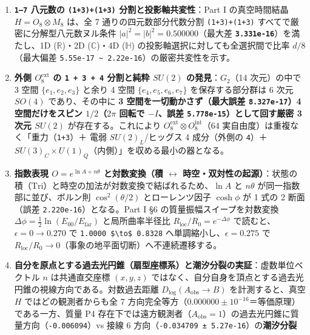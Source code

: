 \documentclass[
  a4paper,
]{ltjsarticle}
\providecommand{\tightlist}{%
  \setlength{\itemsep}{0pt}\setlength{\parskip}{0pt}}
\begin{document}
\begin{enumerate}
\def\labelenumi{\arabic{enumi}.}
\tightlist
\item
  \textbf{\texttt{1–7} 八元数の \texttt{(1+3)+(1+3)}
  分割と投影軸共変性}：Part I の真空時間結晶 \(H = O_8 \otimes M_8\)
  は、全 7 通りの四元数部分代数分割 \texttt{(1+3)+(1+3)}
  すべてで厳密に分解型八元数ヌル条件
  \(|a|^2 = |b|^2 = 0.500000\)（最大差
  \textbf{\texttt{3.331e-16}}）を満たし、1D (\(\mathbb{R}\))・2D
  (\(\mathbb{C}\))・4D (\(\mathbb{H}\))
  の投影軸選択に対しても全選択間で比率 \(d/8\)（最大偏差
  \texttt{5.55e-17\ \textasciitilde{}\ 2.22e-16}）の厳密共変性を示す。
\item
  \textbf{外側 \(O_8^{\mathrm{ext}}\) の \texttt{1\ +\ 3\ +\ 4}
  分割と純粋 \(SU(2)\) の発見}：\(G_2\)（14 次元）の中で 3 空間
  \(\{e_1,e_2,e_3\}\) と余り 4 空間 \(\{e_4,e_5,e_6,e_7\}\)
  を保存する部分群は 6 次元 \(SO(4)\) であり、その中に \textbf{3
  空間を一切動かさず（最大誤差 \texttt{8.327e-17}）4 空間だけをスピン
  \(1/2\)（\(2\pi\) 回転で \(-I\)、誤差
  \texttt{5.778e-15}）として回す厳密 3 次元 \(SU(2)\)}
  が存在する。これにより
  \(O_8^{\mathrm{ext}} \otimes O_8^{\mathrm{int}}\)（64
  実自由度）は重複なく「重力（\texttt{1+3}）＋ 電弱 \(SU(2)_L\)/ヒッグス
  4 成分（外側の \texttt{4}）＋
  \(SU(3)_C\times U(1)_Q\)（内側）」を収める最小の器となる。
\item
  \textbf{指数表現 \(O = e^{\ln A + n\theta}\) と対数変換（積
  \(\leftrightarrow\)
  時空・双対性の起源）}：状態の積（\(\mathrm{Tri}\)）と時空の加法が対数変換で結ばれるため、\(\ln A\)
  と \(n\theta\) が同一指数部に並び、ボルン則 \(\cos^2(\theta/2)\)
  とローレンツ因子 \(\cosh\phi\) が 1 式の 2 断面（誤差
  \texttt{2.220e-16}）となる。Part I §6 の質量振幅スイープを対数変換
  \(\Delta\phi = \frac{1}{2}\ln(E_{00}/E_{\mathrm{far}})\)
  と局所曲率半径比 \(R_{\mathrm{loc}}/R_0 = e^{-\Delta\phi}\)
  で読むと、\(\epsilon = 0 \to 0.270\) で
  \texttt{1.0000\ \$\textbackslash{}to\$\ 0.8328}
  へ単調縮小し、\(\epsilon = 0.275\) で
  \(R_{\mathrm{loc}}/R_0 \to 0\)（事象の地平面切断）へ不連続遷移する。
\item
  \textbf{自分を原点とする過去光円錐（扇型座標系）と潮汐分裂の実証}：虚数単位ベクトル
  \(n\) は共通直交座標 \((x,y,z)\)
  ではなく、自分自身を頂点とする過去光円錐の視線方向である。対数過去距離
  \(D_{\log}(A_{\mathrm{obs}}\to B)\) を計測すると、真空 \(H\)
  ではどの観測者からも全 7
  方向完全等方（\(0.000000 \pm 10^{-16}\)＝等価原理）である一方、質量 P4
  存在下では遠方観測者（\(A_{\mathrm{obs}}=1\)）の過去光円錐に質量方向（\texttt{-0.006094}）vs
  接線 6 方向（\texttt{-0.034709\ ±\ 5.27e-16}）の\textbf{潮汐分裂
}
\end{enumerate}
\end{document}
